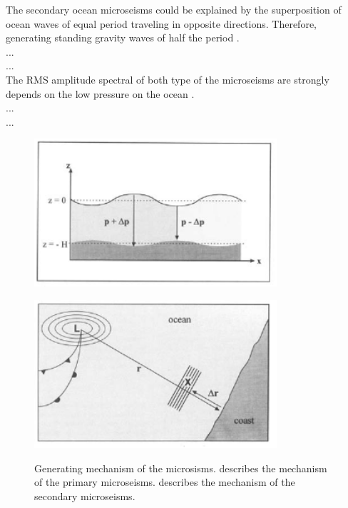 The secondary ocean microseisms could be explained by the superposition of ocean waves of equal period traveling in opposite directions. Therefore, generating standing gravity waves of half the period \cite{longuet1950theory}. 
\\
...\\
...\\

The RMS amplitude spectral of both type of the microseisms are strongly depends on the low pressure on the ocean \cite{Naticchioni2014microseismic}.
\\
...\\
...\\

\begin{figure}[h]
  \begin{center}
    \begin{minipage}[b]{0.65\hsize}
      \centering
      \includegraphics[width=9.0cm]{./img_chap3/img311.png}
      \label{img:img311}
    \end{minipage}
    \begin{minipage}[b]{0.65\hsize}
      \centering      
      \includegraphics[width=9.0cm]{./img_chap3/img312.png}
      \label{img:img312}
    \end{minipage}
  \end{center}
  \caption{ Generating mechanism of the microsisms.  describes the mechanism of the primary microseisms.  describes the mechanism of the secondary microseisms.}
\end{figure}


